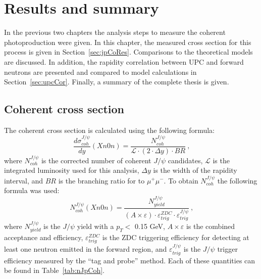 \chapter{Results and summary}
  In the previous two chapters the analysis steps to measure the coherent
    \JPsi{} photoproduction were given.
  In this chapter, the measured cross section for this process is given
    in Section~\ref{sec:jpCoRes}.
  Comparisons to the theoretical models are discussed. 
  In addition, the rapidity correlation between UPC \JPsi{} and forward
    neutrons are presented and compared to model calculations in 
    Section~\ref{sec:upcCor}. 
  Finally, a summary of the complete thesis is given.  
  
  \section{Coherent \JPsi{} cross section\label{sec:jpCoRes}}
    The coherent \JPsi{} cross section is calculated using the following
      formula:
    \begin{equation}
    \frac{d\sigma^{J/\psi}_{coh}}{dy} (Xn0n)= \frac{N^{J/\psi}_{coh}}{\mathcal{L} \cdot (2 \cdot \Delta y )\cdot BR}~\textrm{,}
    \label{eq:expXSecCo}
    \end{equation}
      where $N^{J/\psi}_{coh}$ is the corrected number of coherent $J/\psi$
      candidates,  $\mathcal{L}$ is the integrated luminosity used for this 
      analysis, $\Delta y$ is the width of the rapidity interval, and $BR$ is 
      the branching ratio for \JPsi{} to $\mu^{+}\mu^{-}$. 
    To obtain $N^{J/\psi}_{coh}$ the following formula was used:
    \begin{equation}
    N^{J/\psi}_{coh}(Xn0n) = \frac{N^{J/\psi}_{yield}}{(A\times \varepsilon) \cdot \varepsilon^{ZDC}_{trig} \cdot \varepsilon^{J/\psi}_{trig}}~\textrm{,}
    \end{equation}
      where $N^{J/\psi}_{yield}$ is the $J/\psi$ yield with a $p_{T} <$ 0.15 
      GeV, $A\times \varepsilon$ is the combined acceptance and efficiency, 
      $\varepsilon^{ZDC}_{trig}$ is the ZDC triggering efficiency for detecting
      at least one neutron emitted in the forward region, and 
      $\varepsilon^{J/\psi}_{trig}$ is the $J/\psi$ trigger efficiency measured
      by the ``tag and probe'' method. 
    Each of these quantities can be found in Table~\ref{tab:nJpCoh}.
